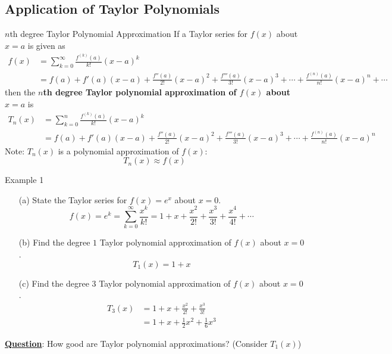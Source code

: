 \documentclass[12pt,a4paper]{article}
\begin{document}
\subsection{Application of Taylor Polynomials}
\begin{df}{$n$th degree Taylor Polynomial Approximation}
	If a Taylor series for $f(x)$ about $x=a$ is given as
	$$\begin{aligned}
		f(x)&=\sum^\infty_{k=0}\frac{f^{(k)}(a)}{k!}(x-a)^k\\
		&=f(a)+f'(a)(x-a)+\frac{f''(a)}{2!}(x-a)^2+\frac{f'''(a)}{3!}(x-a)^3+\cdots+\frac{f^{(n)}(a)}{n!}(x-a)^n+\cdots
	\end{aligned}$$
	then the \textbf{$n$th degree Taylor polynomial approximation of $f(x)$ about $x=a$} is 
	$$\begin{aligned}
		T_n(x)&=\sum^{n}_{k=0}\frac{f^{(k)}(a)}{k!}(x-a)^k\\
		&=f(a)+f'(a)(x-a)+\frac{f''(a)}{2!}(x-a)^2+\frac{f'''(a)}{3!}(x-a)^3+\cdots+\frac{f^{(n)}(a)}{n!}(x-a)^n
	\end{aligned}$$
	Note: $T_n(x)$ is a polynomial approximation of $f(x)$:
	$$T_n(x)\approx f(x)$$
\end{df}
\begin{eg}{Example 1}
	\begin{enumerate}
		\item[(a)] State the Taylor series for $f(x)=e^x$ about $x=0$.
		$$f(x)=e^{k}=\sum^\infty_{k=0}\frac{x^k}{k!}=1+x+\frac{x^2}{2!}+\frac{x^3}{3!}+\frac{x^4}{4!}+\cdots$$
		\item[(b)] Find the degree $1$ Taylor polynomial approximation of $f(x)$ about $x=0$.
		$$T_1(x)=1+x$$
		\item[(c)] Find the degree $3$ Taylor polynomial approximation of $f(x)$ about $x=0$. 
		$$\begin{aligned}
			T_3(x)&=1+x+\frac{x^2}{2!}+\frac{x^3}{3!}\\
			&=1+x+\frac{1}{2}x^2+\frac{1}{6}x^3
		\end{aligned}$$
	\end{enumerate}	
\end{eg}
\underline{\textbf{Question}}: How good are Taylor polynomial approximations? (Consider $T_1(x)$)
\end{document}
